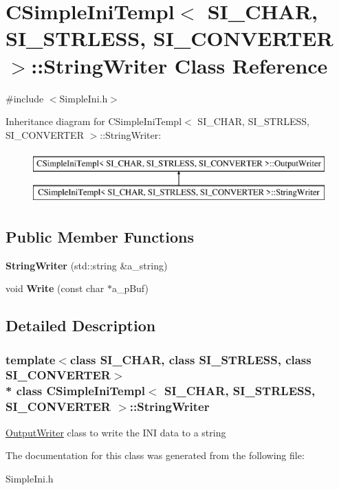 \hypertarget{a00297}{}\section{C\+Simple\+Ini\+Templ$<$ S\+I\+\_\+\+C\+H\+AR, S\+I\+\_\+\+S\+T\+R\+L\+E\+SS, S\+I\+\_\+\+C\+O\+N\+V\+E\+R\+T\+ER $>$\+:\+:String\+Writer Class Reference}
\label{a00297}


{\ttfamily \#include $<$Simple\+Ini.\+h$>$}

Inheritance diagram for C\+Simple\+Ini\+Templ$<$ S\+I\+\_\+\+C\+H\+AR, S\+I\+\_\+\+S\+T\+R\+L\+E\+SS, S\+I\+\_\+\+C\+O\+N\+V\+E\+R\+T\+ER $>$\+:\+:String\+Writer\+:\begin{figure}[H]
\begin{center}
\leavevmode
\includegraphics[height=2.000000cm]{a00297}
\end{center}
\end{figure}
\subsection*{Public Member Functions}
\begin{DoxyCompactItemize}
\item 
{\bfseries String\+Writer} (std\+::string \&a\+\_\+string)\hypertarget{a00297_ad50338a07a9b6de7e4a78d0bbc11f67b}{}\label{a00297_ad50338a07a9b6de7e4a78d0bbc11f67b}

\item 
void {\bfseries Write} (const char $\ast$a\+\_\+p\+Buf)\hypertarget{a00297_afdfd0dfe71278ea7490a9d4ef6bffadc}{}\label{a00297_afdfd0dfe71278ea7490a9d4ef6bffadc}

\end{DoxyCompactItemize}


\subsection{Detailed Description}
\subsubsection*{template$<$class S\+I\+\_\+\+C\+H\+AR, class S\+I\+\_\+\+S\+T\+R\+L\+E\+SS, class S\+I\+\_\+\+C\+O\+N\+V\+E\+R\+T\+ER$>$\\*
class C\+Simple\+Ini\+Templ$<$ S\+I\+\_\+\+C\+H\+A\+R, S\+I\+\_\+\+S\+T\+R\+L\+E\+S\+S, S\+I\+\_\+\+C\+O\+N\+V\+E\+R\+T\+E\+R $>$\+::\+String\+Writer}

\hyperlink{a00229}{Output\+Writer} class to write the I\+NI data to a string 

The documentation for this class was generated from the following file\+:\begin{DoxyCompactItemize}
\item 
Simple\+Ini.\+h\end{DoxyCompactItemize}
